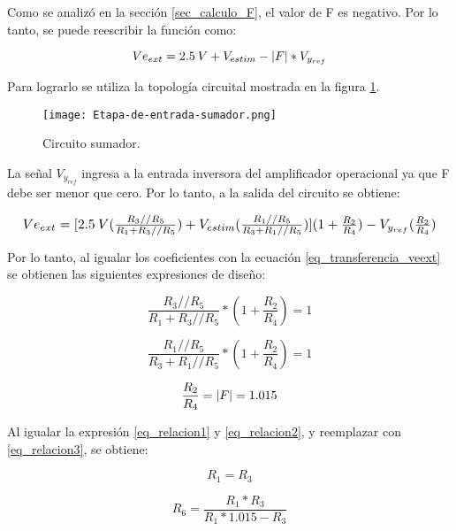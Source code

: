 Como se analizó en la sección \ref{sec_calculo_F}, el valor de F es negativo. Por lo tanto, se puede reescribir la función como:

\begin{equation} \label{eq_transferencia_veext}
	Ve_{ext}= 2.5\:V + V_{estim} - \lvert F\rvert*V_{y_{ref}}
\end{equation}

Para lograrlo se utiliza la topología circuital mostrada en la figura \ref{fig:etapa-de-entrada-sumador}.

\begin{figure}[H]
	\centering
	\texttt{[image: Etapa-de-entrada-sumador.png]}
	\caption{Circuito sumador.}
	\label{fig:etapa-de-entrada-sumador}
\end{figure}

La señal $V_{y_{ref}}$ ingresa a la entrada inversora del amplificador operacional ya que F debe ser menor que cero. Por lo tanto, a la salida del circuito se obtiene:

\begin{equation*}
	\resizebox{.99\hsize}{!}
	{
		$
		Ve_{ext}= [2.5\:V (\frac{R_3//R_5}{R_1+R_3//R_5})+V_{estim}(\frac{R_1//R_5}{R_3+R_1//R_5})](1+\frac{R_2}{R_4})-V_{y_{ref}}(\frac{R_2}{R_4})
		$
	}
\end{equation*}


Por lo tanto, al igualar los coeficientes con la ecuación \ref{eq_transferencia_veext} se obtienen las siguientes expresiones de diseño:


\begin{equation} \label{eq_relacion1}
	\frac{R_3//R_5}{R_1+R_3//R_5}*(1+\frac{R_2}{R_4})=1
\end{equation}

\begin{equation} \label{eq_relacion2}
	\frac{R_1//R_5}{R_3+R_1//R_5}*(1+\frac{R_2}{R_4})=1
\end{equation}

\begin{equation} \label{eq_relacion3} 
	\frac{R_2}{R_4}=\lvert F\rvert=1.015
\end{equation}

Al igualar la expresión \ref{eq_relacion1} y \ref{eq_relacion2}, y reemplazar con \ref{eq_relacion3}, se obtiene:

\begin{equation*} 
	R_1 = R_3
\end{equation*}

\begin{equation*} 
	R_6=\frac{R_1*R_3}{R_1*1.015-R_3}
\end{equation*}

